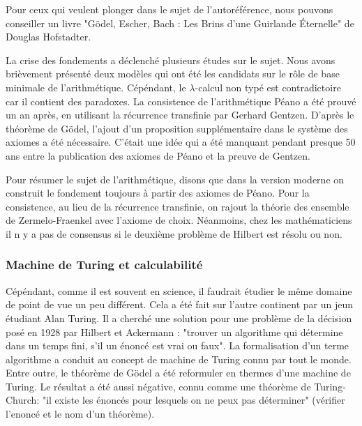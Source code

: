 \documentclass[12pt, a4paper]{article}
\begin{document}
{\footnotesize
	Pour ceux qui veulent plonger dans le sujet de l'autoréférence, nous pouvons conseiller un livre "Gödel, Escher, Bach : Les Brins d'une Guirlande Éternelle" de Douglas Hofstadter.
}

La crise des fondements a déclenché plusieurs études sur le sujet.
Nous avons brièvement présenté deux modèles qui ont été les candidats sur le rôle de base minimale de l'arithmétique.
Cépéndant, le $\lambda$-calcul non typé est contradictoire car il contient des paradoxes.
La consistence de l'arithmétique Péano a été prouvé un an après, en utilisant la récurrence transfinie par Gerhard Gentzen.
D'après le théorème de Gödel, l'ajout d'un proposition supplémentaire dans le système des axiomes a été nécessaire.
C'était une idée qui a été manquant pendant presque 50 ans entre la publication des axiomes de Péano et la preuve de Gentzen.


Pour résumer le sujet de l'arithmétique, disons que dans la version moderne on construit le fondement toujours à partir des axiomes de Péano.
Pour la consistence, au lieu de la récurrence transfinie, on rajout la théorie des ensemble de Zermelo-Fraenkel avec l'axiome de choix.
Néanmoins, chez les mathématiciens il n y a pas de consensus si le deuxième problème de Hilbert est résolu ou non.

\subsubsection*{Machine de Turing et calculabilité}
Cépéndant, comme il est souvent en science, il faudrait étudier le même domaine de point de vue un peu différent. Cela a été fait sur l'autre continent par un jeun étudiant Alan Turing. Il a cherché une solution pour une problème de la décision posé en 1928 par Hilbert et Ackermann : "trouver un algorithme qui détermine dans un temps fini, s'il un énoncé est vrai ou faux". La formalisation d'un terme algorithme a conduit au concept de machine de Turing connu par tout le monde. Entre outre, le théorème de Gödel a été reformuler en thermes d'une machine de Turing.
Le résultat a été aussi négative, connu comme une théorème de Turing-Church: "il existe les énoncés pour lesquels on ne peux pas déterminer" (vérifier l'enoncé et le nom d'un théorème).
\end{document}
